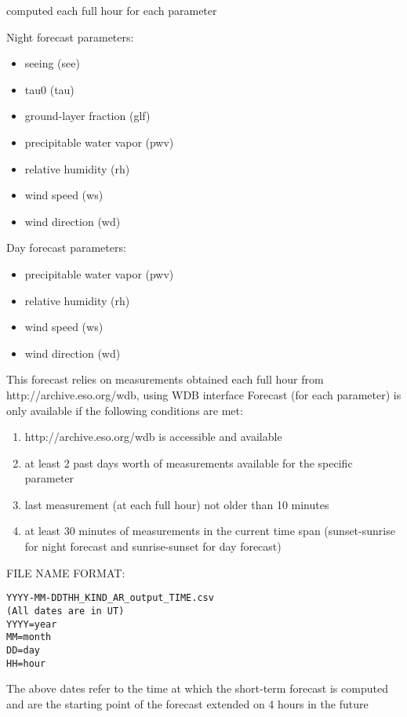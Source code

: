 \documentclass[11pt,english]{article}
\begin{document}
computed each full hour for each parameter

Night forecast parameters:
\begin{itemize}
        \item seeing (see)
        \item tau0 (tau)
        \item ground-layer fraction (glf)
        \item precipitable water vapor (pwv)
        \item relative humidity (rh)
        \item wind speed (ws)
        \item wind direction (wd)
\end{itemize}
Day forecast parameters:
\begin{itemize}
        \item precipitable water vapor (pwv)
        \item relative humidity (rh)
        \item wind speed (ws)
        \item wind direction (wd)      
\end{itemize}
This forecast relies on measurements obtained each full hour from http://archive.eso.org/wdb, using WDB interface
Forecast (for each parameter) is only available if the following conditions are met:
\begin{enumerate}
\item http://archive.eso.org/wdb is accessible and available
\item at least 2 past days worth of measurements available for the specific parameter
\item last measurement (at each full hour) not older than 10 minutes
\item at least 30 minutes of measurements in the current time span (sunset-sunrise for night forecast and sunrise-sunset for day forecast)
\end{enumerate}

FILE NAME FORMAT:
\begin{verbatim}
YYYY-MM-DDTHH_KIND_AR_output_TIME.csv
(All dates are in UT)
YYYY=year
MM=month
DD=day
HH=hour
\end{verbatim}
The above dates refer to the time at which the short-term forecast is computed and are the starting point of the forecast extended on 4 hours in the future
\end{document}
